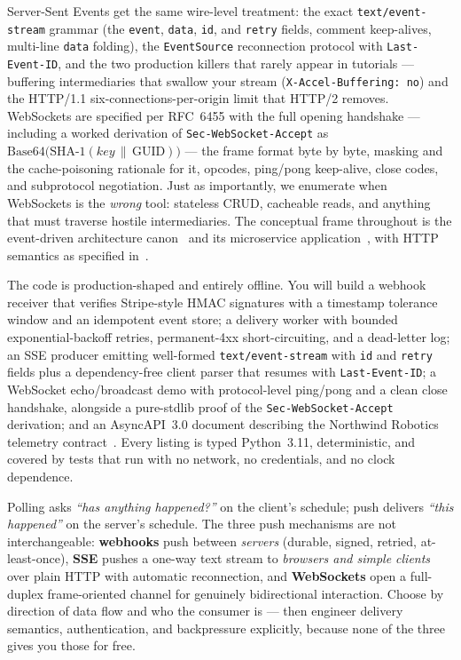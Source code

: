Server-Sent Events get the same wire-level treatment: the exact
\texttt{text/event-stream} grammar (the \texttt{event}, \texttt{data},
\texttt{id}, and \texttt{retry} fields, comment keep-alives, multi-line
\texttt{data} folding), the \texttt{EventSource} reconnection protocol with
\texttt{Last-Event-ID}, and the two production killers that rarely appear in
tutorials --- buffering intermediaries that swallow your stream
(\texttt{X-Accel-Buffering: no}) and the HTTP/1.1 six-connections-per-origin
limit that HTTP/2 removes. WebSockets are specified per RFC~6455 with the
full opening handshake --- including a worked derivation of
\texttt{Sec-WebSocket-Accept} as
$\mathrm{Base64}\bigl(\mathrm{SHA\text{-}1}(key \,\|\, \mathrm{GUID})\bigr)$ ---
the frame format byte by byte, masking and the cache-poisoning rationale for
it, opcodes, ping/pong keep-alive, close codes, and subprotocol negotiation.
Just as importantly, we enumerate when WebSockets is the \emph{wrong} tool:
stateless CRUD, cacheable reads, and anything that must traverse hostile
intermediaries. The conceptual frame throughout is the event-driven
architecture canon~\cite{kleppmann2017ddia} and its microservice
application~\cite{newman2021microservices}, with HTTP semantics as specified
in~\cite{rfc9110}.

The code is production-shaped and entirely offline. You will build a webhook
receiver that verifies Stripe-style HMAC signatures with a timestamp
tolerance window and an idempotent event store; a delivery worker with
bounded exponential-backoff retries, permanent-4xx short-circuiting, and a
dead-letter log; an SSE producer emitting well-formed
\texttt{text/event-stream} with \texttt{id} and \texttt{retry} fields plus a
dependency-free client parser that resumes with \texttt{Last-Event-ID}; a
WebSocket echo/broadcast demo with protocol-level ping/pong and a clean close
handshake, alongside a pure-stdlib proof of the
\texttt{Sec-WebSocket-Accept} derivation; and an AsyncAPI~3.0 document
describing the Northwind Robotics telemetry contract~\cite{asyncapi}. Every
listing is typed Python~3.11, deterministic, and covered by tests that run
with no network, no credentials, and no clock dependence.

\begin{keyconceptbox}
Polling asks \emph{``has anything happened?''} on the client's schedule; push
delivers \emph{``this happened''} on the server's schedule. The three push
mechanisms are not interchangeable: \textbf{webhooks} push between
\emph{servers} (durable, signed, retried, at-least-once), \textbf{SSE} pushes
a one-way text stream to \emph{browsers and simple clients} over plain HTTP
with automatic reconnection, and \textbf{WebSockets} open a full-duplex
frame-oriented channel for genuinely bidirectional interaction. Choose by
direction of data flow and who the consumer is --- then engineer delivery
semantics, authentication, and backpressure explicitly, because none of the
three gives you those for free.
\end{keyconceptbox}

